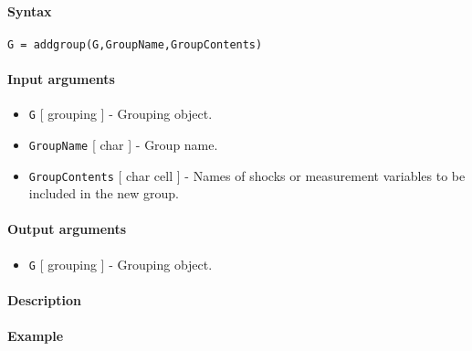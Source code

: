 


	\paragraph{Syntax}\label{syntax}

\begin{verbatim}
G = addgroup(G,GroupName,GroupContents)
\end{verbatim}

\paragraph{Input arguments}\label{input-arguments}

\begin{itemize}
\item
  \texttt{G} {[} grouping {]} - Grouping object.
\item
  \texttt{GroupName} {[} char {]} - Group name.
\item
  \texttt{GroupContents} {[} char \textbar{} cell {]} - Names of shocks
  or measurement variables to be included in the new group.
\end{itemize}

\paragraph{Output arguments}\label{output-arguments}

\begin{itemize}
\itemsep1pt\parskip0pt
\item
  \texttt{G} {[} grouping {]} - Grouping object.
\end{itemize}

\paragraph{Description}\label{description}

\paragraph{Example}\label{example}


